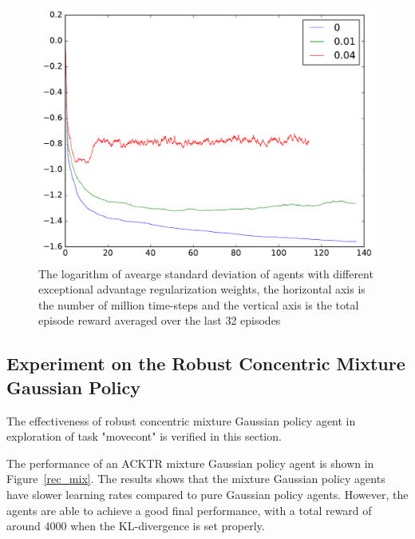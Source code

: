 \begin{figure}[!htbp]
	\includegraphics[width=\textwidth]{images/rec_std_adv_reg.pdf}
	\centering
	\caption{The logarithm of avearge standard deviation of agents with different exceptional advantage regularization weights, the horizontal axis is the number of million time-steps and the vertical axis is the total episode reward averaged over the last 32 episodes}\label{rec_std_adv_reg}
\end{figure}

\subsection{Experiment on the Robust Concentric Mixture Gaussian Policy}
The effectiveness of robust concentric mixture Gaussian policy agent in exploration of task "movecont" is verified in this section. 

The performance of an ACKTR mixture Gaussian policy agent is shown in Figure~\ref{rec_mix}. The results shows that the mixture Gaussian policy agents have slower learning rates compared to pure Gaussian policy agents. However, the agents are able to achieve a good final performance, with a total reward of around 4000 when the KL-divergence is set properly.


